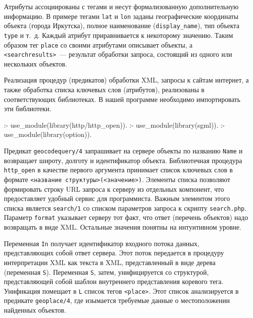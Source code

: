 \documentclass[a4paper,14pt, openany, twoside, draft]{extbook} %
\begin{document}
Атрибуты ассоциированы с тегами и несут формализованную дополнительную информацию.  В примере тегами \texttt{lat} и \texttt{lon} заданы географические координаты объекта (города Иркутска), полное наименование (\texttt{display\_name}), тип объекта \texttt{type} и т.~д.  Каждый атрибут приравнивается к некоторому значению.  Таким образом тег \texttt{place} со своими атрибутами описывает объекты, а \texttt{<searchresults>}~--- результат обработки запроса, состоящий из одного или нескольких объектов.

Реализация процедур (предикатов) обработки XML, запросы к сайтам интернет, а также обработка списка ключевых слов (атрибутов), реализованы в соответствующих библиотеках.  В нашей программе необходимо импортировать эти библиотеки.

\begin{proexp}
:- use_module(library(http/http_open)).
:- use_module(library(sgml)).   %
:- use_module(library(option)).
\end{proexp}


Предикат \texttt{geocodequery/4} запрашивает на сервере объекты по названию \texttt{Name} и возвращает широту, долготу и идентификатор объекта.  Библиотечная процедура \texttt{http\_open} в качестве первого аргумента принимает список ключевых слов в формате \texttt{<название структуры>(<значение>)}.  Элементы списка позволяют формировать строку URL запроса к серверу из отдельных компонент, что предоставляет удобный сервис для программиста.  Важным элементом этого списка является \texttt{search/1} со списком параметров запроса к скрипту \texttt{search.php}.  Параметр \texttt{format} указывает серверу тот факт, что ответ (перечень объектов) надо возвращать в виде XML.  Остальные значения понятны на интуитивном уровне.

Переменная \texttt{In} получает идентификатор входного потока данных, представляющих собой ответ сервера.  Этот поток передается в процедуру интерпретации XML как текста в XML, представленный в виде дерева (переменная \texttt{S}).  Переменная \texttt{S}, затем, унифицируется со структурой, представляющей собой шаблон внутреннего представления коревого тега.  Унификация помещает в \texttt{L} список тегов \texttt{<place>}.  Этот список анализируется в предикате \texttt{geoplace/4}, где изымается требуемые данные о местоположении найденных объектов.
\end{document}
